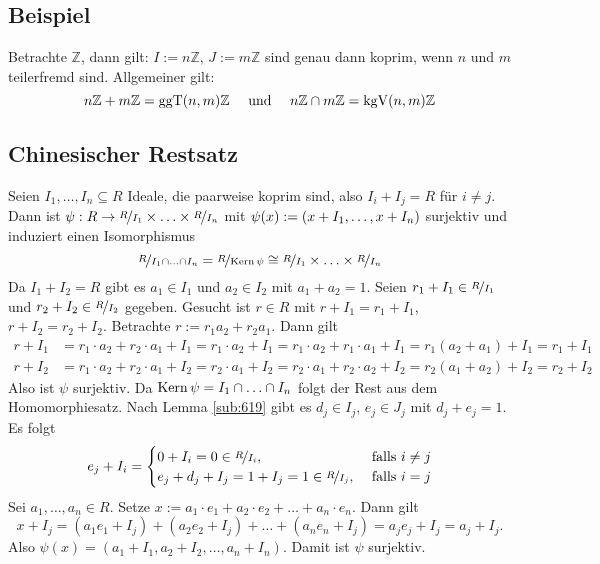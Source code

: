 \subsection[Beispiel: Koprime Ideale in $\mathds{Z}$]{Beispiel} %
\label{sub:617}
Betrachte $\mathds{Z}$, dann gilt: $I := n \mathds{Z}, \, J := m \mathds{Z}$ sind genau dann koprim, wenn $n$ und $m$ teilerfremd sind. Allgemeiner gilt: 
\[
	n \mathds{Z} + m \mathds{Z} = \ggT(n,m)  \mathds{Z} \quad \text{ und } \quad n \mathds{Z} \cap m \mathds{Z} = \kgV(n,m) \mathds{Z}
\]

\subsection{Chinesischer Restsatz} %
\label{sub:618}
Seien $I_1, \ldots , I_n \subseteq R$ Ideale, die paarweise koprim sind, also $I_i + I_j =R$ für $i\not= j$. Dann ist 
$\psi : R \to \nicefrac{R}{I_1} \times \ldots \times \nicefrac{R}{I_n}$ mit $\psi(x) := \enbrace*{x+ I_1, \ldots , x+ I_n}$ surjektiv und induziert einen Isomorphismus
\[
	\nicefrac{R}{I_1 \cap \ldots \cap I_n} = \nicefrac{R}{\Kern \psi} \cong \nicefrac{R}{I_1} \times \ldots \times \nicefrac{R}{I_n}
\]
Da $I_1 + I_2 =R$ gibt es $a_1 \in I_1$ und $a_2 \in I_2$ mit $a_1 + a_2 = 1$. Seien $r_1 + I_1 \in \nicefrac{R}{I_1}$ und $r_2 + I_2 \in \nicefrac{R}{I_2}$ gegeben.
Gesucht ist $r \in R$ mit $r+ I_1 = r_1+I_1$, $r+ I_2 = r_2 + I_2$. Betrachte $r := r_1 a_2 + r_2 a_1$. Dann gilt 
\begin{align*}
	r + I_1 &= r_1 \cdot a_2 + r_2 \cdot a_1 + I_1 = r_1 \cdot a_2 +I_1 = r_1 \cdot a_2 + r_1 \cdot a_1 +I_1 = r_1(a_2 +a_1) +I_1 = r_1 + I_1 \\
	r + I_2 &= r_1 \cdot a_2 + r_2 \cdot a_1 + I_2 = r_2 \cdot a_1 + I_2 = r_2 \cdot a_1 + r_2 \cdot a_2 + I_2 = r_2(a_1+ a_2) + I_2 = r_2 + I_2
\end{align*}
Also ist $\psi$ surjektiv. Da $\Kern \psi = I_1 \cap \ldots \cap I_n$ folgt der Rest aus dem Homomorphiesatz. \bewende
{}
Nach Lemma \ref{sub:619} gibt es $d_j \in I_j$, $e_j \in J_j$ mit $d_j + e_j = 1$. Es folgt 
\[
	e_j + I_i = \begin{cases}
		0+ I_i = 0 \in \nicefrac{R}{I_i}, &\text{ falls }i \not= j\\
		e_j + d_j + I_j = 1+ I_j = 1 \in \nicefrac{R}{I_j}, &\text{ falls } i=j
	\end{cases}
\]
Sei $a_1, \ldots , a_n \in R$. Setze $x := a_1 \cdot e_1 + a_2 \cdot e_2 + \ldots + a_n \cdot e_n$. Dann gilt
\[
	x+I_j = (a_1 e_1 + I_j) + (a_2 e_2 + I_j) + \ldots + (a_n e_n + I_j) = a_j e_j + I_j = a_j + I_j.
\]
Also $\psi(x) = (a_1 + I_1, a_2 + I_2, \ldots , a_n +I_n)$. Damit ist $\psi$ surjektiv. \bewende

